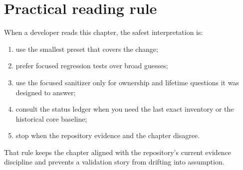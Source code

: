 \section{Practical reading rule}
\label{sec:test-practical-reading-rule}

When a developer reads this chapter, the safest interpretation is:
\begin{enumerate}
\item use the smallest preset that covers the change;
\item prefer focused regression tests over broad guesses;
\item use the focused sanitizer only for ownership and lifetime questions it
was designed to answer;
\item consult the status ledger when you need the last exact inventory or the
historical core baseline;
\item stop when the repository evidence and the chapter disagree.
\end{enumerate}

That rule keeps the chapter aligned with the repository's current evidence
discipline and prevents a validation story from drifting into assumption.
